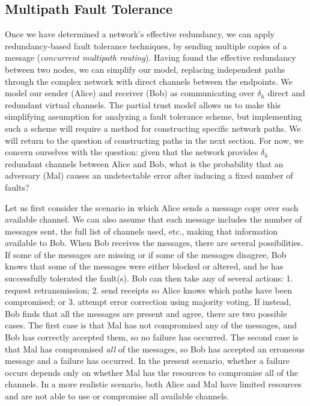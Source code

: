 \documentclass{sig-alternate-05-2015}
\begin{document}
\subsection{Multipath Fault Tolerance}

Once we have determined a network's effective redundancy,
we can apply redundancy-based fault tolerance techniques,
by sending multiple copies of a message
({\em concurrent multipath routing}).
Having found the effective redundancy between two nodes,
we can simplify our model, replacing independent paths through the
complex network with direct channels between the endpoints.
We model our sender (Alice) and receiver (Bob) as
communicating over $\delta_h$ direct and redundant virtual channels.
The partial trust model allows us to make this simplifying assumption
for analyzing a fault tolerance scheme,
but implementing such a scheme will require a method for constructing
specific network paths.
We will return to the question of constructing paths in the next section.
For now, we concern ourselves with the question:
given that the network provides $\delta_h$ redundant channels between
Alice and Bob,
what is the probability that an adversary (Mal) causes an undetectable
error after inducing a fixed number of faults?

Let us first consider the scenario in which
Alice sends a message copy over each available channel.
We can also assume that each message includes the number of messages sent,
the full list of channels used, etc.,
making that information available to Bob.
When Bob receives the messages, there are several possibilities.
If some of the messages are missing
or if some of the messages disagree,
Bob knows that some of the messages were either blocked or altered,
and he has successfully tolerated the fault(s).
Bob can then take any of several actions:
1. request retransmission;
2. send receipts so Alice knows which paths have been compromised;
or 3. attempt error correction using majority voting.
If instead, Bob finds that all the messages are present and agree,
there are two possible cases.
The first case is that Mal has not compromised any of the messages,
and Bob has correctly accepted them, so no failure has occurred.
The second case is that Mal has compromised {\em all} of the messages,
so Bob has accepted an erroneous message and a failure has occurred.
In the present scenario,
whether a failure occurs depends only on whether Mal has the resources to
compromise all of the channels.
In a more realistic scenario,
both Alice and Mal have limited resources and are not able to use or
compromise all available channels.
\end{document}
